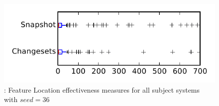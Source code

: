 
\begin{figure}
\centering
\includegraphics[height=0.4\textheight]{figures/flt_seed/rq1_tiny_36}
\caption{\rone: Feature Location effectiveness measures for all subject systems with $seed=36$}
\label{fig:flt_seed:rq1:tiny}
\end{figure}
